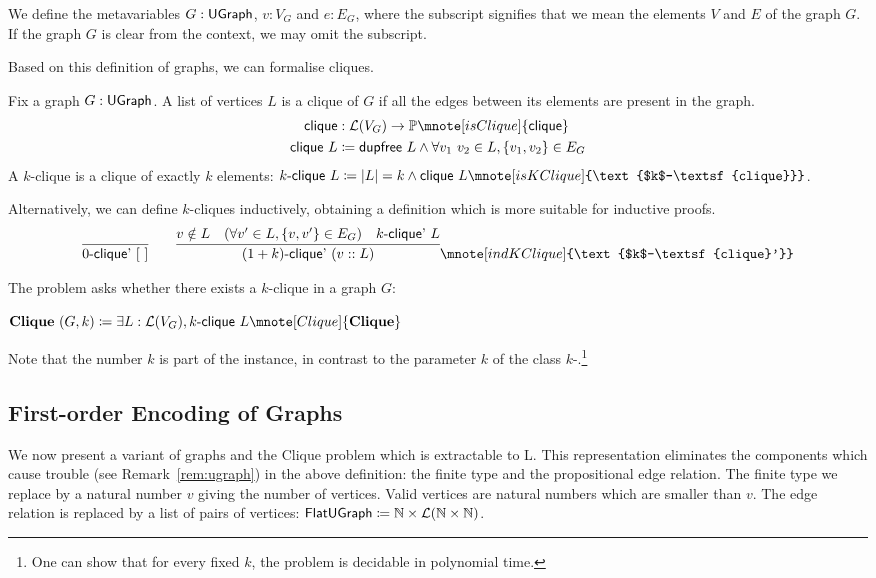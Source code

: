 We define the metavariables $G : \textsf{UGraph}$, $v : V_G$ and $e : E_G$, where the subscript signifies that we mean the elements $V$ and $E$ of the graph $G$. If the graph $G$ is clear from the context, we may omit the subscript. 

\newcommand{\clique}{\textsf{clique}}
\newcommand{\kclique}[1]{\text{$#1$-\clique}} 
\newcommand{\kcliqueind}[1]{\text{$#1$-\textsf{clique}'}}
Based on this definition of graphs, we can formalise cliques. 
\begin{definition}
  Fix a graph $G : \textsf{UGraph}$. A list of vertices $L$ is a clique of $G$ if all the edges between its elements are present in the graph.
  \begin{align*}
    \clique{} &: \listsof{V_G} \rightarrow \Prop\mnote[isClique]{\clique{}} \\
    \clique{}~L &\defeq \dupfree~L \land \forall v_1~v_2 \in L, \{v_1, v_2\} \in E_G 
  \end{align*}
  A $k$-clique is a clique of exactly $k$ elements: 
  $\kclique{k}~L \defeq \length{L} = k \land \clique{}~L\mnote[isKClique]{\kclique{k}}$.
\end{definition}

Alternatively, we can define $k$-cliques inductively, obtaining a definition which is more suitable for inductive proofs. 
\begin{align*}
  \infer{\kcliqueind{0}~\nil}{} \qquad \infer{\kcliqueind{(\natS{k})}~(v :: L)}{v \notin L \quad (\forall v' \in L, \{v, v'\} \in E_G) \quad \kcliqueind{k}~L}\mnote[indKClique]{\kcliqueind{k}}
\end{align*}

The \Clique{} problem asks whether there exists a $k$-clique in a graph $G$: 
\begin{definition}[\Clique{}][Clique]
  $\normalfont{\Clique{}}~(G, k) \defeq \exists L : \listsof{V_G}, \kclique{k}~L\mnote[Clique]{\normalfont\Clique{}}$
\end{definition}
Note that the number $k$ is part of the instance, in contrast to the parameter $k$ of the class $k$-\SAT{}.\footnote{One can show that for every fixed $k$, the \Clique{} problem is decidable in polynomial time.}

\newcommand{\FlatClique}{\textbf{FlatClique}}
\newcommand{\FlatUGraph}{\textsf{FlatUGraph}}
\subsection{First-order Encoding of Graphs}\label{sec:flat_clique}
We now present a variant of graphs and the Clique problem which is extractable to L. This representation eliminates the components which cause trouble (see Remark~\ref{rem:ugraph}) in the above definition: the finite type and the propositional edge relation. 
The finite type we replace by a natural number $v$ giving the number of vertices. Valid vertices are natural numbers which are smaller than $v$. The edge relation is replaced by a list of pairs of vertices: $\FlatUGraph \defeq \nat \times \listsof{\nat \times \nat}$.\mnote[FlatUGraph]{\FlatUGraph}

